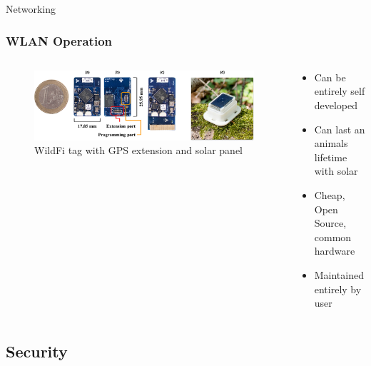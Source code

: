 \documentclass{beamer}
\begin{document}
  \begin{frame}{Networking}
    \frametitle{WLAN Operation}
    \begin{columns}
      \begin{column}{0.5\textwidth}
        \begin{figure}[htbp]
          \centering
          \includegraphics[width=\textwidth]{WildFi_Tag.jpg}
          \caption{WildFi tag with GPS extension and solar panel \cite{wild2023internet}}
          \label{fig:WildFi_Tag}
        \end{figure}
      \end{column}
      \begin{column}{0.5\textwidth}
        \begin{itemize}
          \item Can be entirely self developed
          \item Can last an animals lifetime with solar
          \item Cheap, Open Source, common hardware
          \item Maintained entirely by user
        \end{itemize}
      \end{column}
    \end{columns}
  \end{frame}

\subsection{Security}
\end{document}
